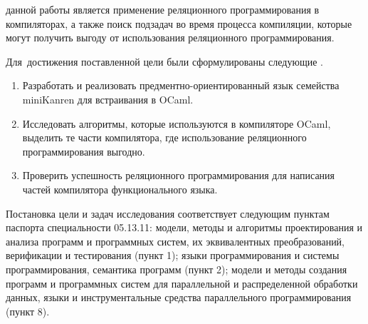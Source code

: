 


{\aim} данной работы является применение реляционного программирования в компиляторах, а также поиск подзадач во время процесса компиляции, которые могут получить выгоду от использования реляционного программирования.

Для~достижения поставленной цели были сформулированы следующие {\tasks}.
\begin{enumerate}
  \item Разработать и реализовать предментно-ориентированный язык семейства miniKanren для встраивания в OCaml.
  \item Исследовать алгоритмы, которые используются в компиляторе OCaml, выделить те части компилятора, где использование реляционного программирования выгодно.
  \item Проверить успешность реляционного программирования для написания частей компилятора функционального языка.
\end{enumerate}

Постановка цели и задач исследования соответствует следующим пунктам паспорта специальности 05.13.11:
модели, методы и алгоритмы проектирования и анализа программ и программных систем, их эквивалентных преобразований, верификации и тестирования (пункт 1);
языки программирования и системы программирования, семантика программ (пункт 2);
модели и методы создания программ и программных систем для параллельной и распределенной обработки данных,
языки и инструментальные средства параллельного программирования (пункт 8).


